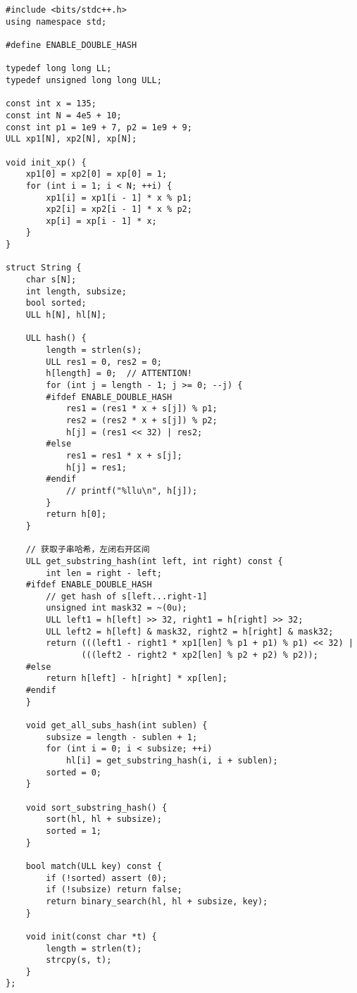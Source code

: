 \documentclass[]{article}
\begin{document}
\begin{verbatim}
#include <bits/stdc++.h>
using namespace std;

#define ENABLE_DOUBLE_HASH

typedef long long LL;
typedef unsigned long long ULL;

const int x = 135;
const int N = 4e5 + 10;
const int p1 = 1e9 + 7, p2 = 1e9 + 9;
ULL xp1[N], xp2[N], xp[N];

void init_xp() {
    xp1[0] = xp2[0] = xp[0] = 1;
    for (int i = 1; i < N; ++i) {
        xp1[i] = xp1[i - 1] * x % p1;
        xp2[i] = xp2[i - 1] * x % p2;
        xp[i] = xp[i - 1] * x;
    }
}

struct String {
    char s[N];
    int length, subsize;
    bool sorted;
    ULL h[N], hl[N];

    ULL hash() {
        length = strlen(s);
        ULL res1 = 0, res2 = 0;
        h[length] = 0;  // ATTENTION!
        for (int j = length - 1; j >= 0; --j) {
        #ifdef ENABLE_DOUBLE_HASH
            res1 = (res1 * x + s[j]) % p1;
            res2 = (res2 * x + s[j]) % p2;
            h[j] = (res1 << 32) | res2;
        #else
            res1 = res1 * x + s[j];
            h[j] = res1;
        #endif
            // printf("%llu\n", h[j]);
        }
        return h[0];
    }

    // 获取子串哈希，左闭右开区间
    ULL get_substring_hash(int left, int right) const {
        int len = right - left;
    #ifdef ENABLE_DOUBLE_HASH
        // get hash of s[left...right-1]
        unsigned int mask32 = ~(0u);
        ULL left1 = h[left] >> 32, right1 = h[right] >> 32;
        ULL left2 = h[left] & mask32, right2 = h[right] & mask32;
        return (((left1 - right1 * xp1[len] % p1 + p1) % p1) << 32) |
               (((left2 - right2 * xp2[len] % p2 + p2) % p2));
    #else
        return h[left] - h[right] * xp[len];
    #endif
    }

    void get_all_subs_hash(int sublen) {
        subsize = length - sublen + 1;
        for (int i = 0; i < subsize; ++i)
            hl[i] = get_substring_hash(i, i + sublen);
        sorted = 0;
    }

    void sort_substring_hash() {
        sort(hl, hl + subsize);
        sorted = 1;
    }

    bool match(ULL key) const {
        if (!sorted) assert (0);
        if (!subsize) return false;
        return binary_search(hl, hl + subsize, key);
    }

    void init(const char *t) {
        length = strlen(t);
        strcpy(s, t);
    }
};


\end{verbatim}
\end{document}
